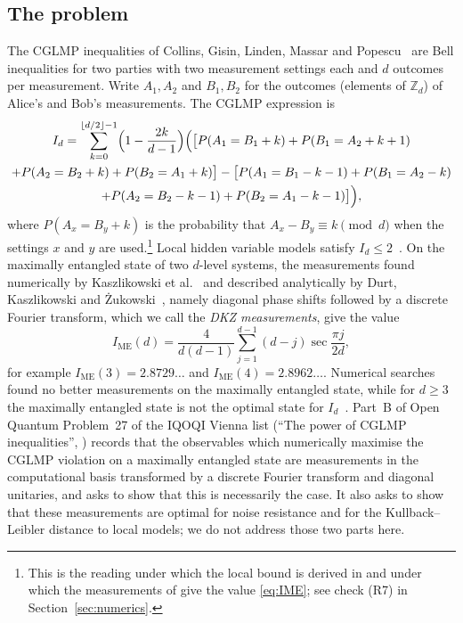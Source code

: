 \documentclass[11pt]{amsart}
\theoremstyle{definition}
\theoremstyle{remark}
\newcommand{\Z}{\mathbb{Z}}
\newcommand{\IME}{I_{\mathrm{ME}}}
\begin{document}
\subsection{The problem}
The CGLMP inequalities of Collins, Gisin, Linden, Massar and Popescu~\cite{CGLMP} are Bell inequalities for two
parties with two measurement settings each and $d$ outcomes per measurement. Write $A_1,A_2$ and $B_1,B_2$ for
the outcomes (elements of $\Z_d$) of Alice's and Bob's measurements. The CGLMP expression is
\begin{multline}\label{eq:cglmp}
I_d=\sum_{k=0}^{\lfloor d/2\rfloor-1}\Bigl(1-\frac{2k}{d-1}\Bigr)\Bigl(\bigl[P(A_1=B_1+k)+P(B_1=A_2+k+1)\\
+P(A_2=B_2+k)+P(B_2=A_1+k)\bigr]
-\bigl[P(A_1=B_1-k-1)+P(B_1=A_2-k)\\
+P(A_2=B_2-k-1)+P(B_2=A_1-k-1)\bigr]\Bigr),
\end{multline}
where $P(A_x=B_y+k)$ is the probability that $A_x-B_y\equiv k\pmod d$ when the settings $x$ and $y$ are
used.\footnote{This is the reading under which the local bound is derived in \cite[eqs.~(7)--(11)]{CGLMP} and
under which the measurements of \cite[eqs.~(12)--(15)]{CGLMP} give the value \eqref{eq:IME}; see check (R7) in
Section~\ref{sec:numerics}.} Local hidden variable models satisfy $I_d\le 2$~\cite{CGLMP}. On the maximally
entangled state of two $d$-level systems, the measurements found numerically by Kaszlikowski et
al.~\cite{KGZMZ} and described analytically by Durt, Kaszlikowski and \.Zukowski~\cite{DKZ}, namely diagonal
phase shifts followed by a discrete Fourier transform, which we call the \emph{DKZ measurements}, give the value
\begin{equation}\label{eq:IME}
\IME(d)=\frac{4}{d(d-1)}\sum_{j=1}^{d-1}(d-j)\sec\frac{\pi j}{2d},
\end{equation}
for example $\IME(3)=2.8729\ldots$ and $\IME(4)=2.8962\ldots$. Numerical searches~\cite{KGZMZ,DKZ,CGLMP} found
no better measurements on the maximally entangled state, while for $d\ge3$ the maximally entangled state is not
the optimal state for $I_d$~\cite{ADGL}. Part~B of Open Quantum Problem~27 of the IQOQI Vienna list (``The power
of CGLMP inequalities'', \cite{OQP}) records that the observables which numerically maximise the CGLMP violation on
a maximally entangled state are measurements in the computational basis transformed by a discrete Fourier
transform and diagonal unitaries, and asks to show that this is necessarily the case. It also asks to show that
these measurements are optimal for noise resistance and for the Kullback--Leibler distance to local models; we do
not address those two parts here.
\end{document}

